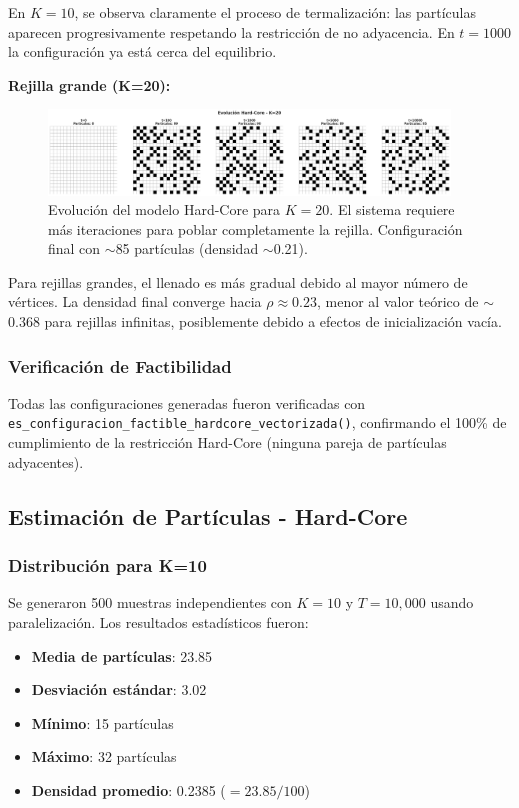 En $K=10$, se observa claramente el proceso de termalización: las partículas aparecen progresivamente respetando la restricción de no adyacencia. En $t=1000$ la configuración ya está cerca del equilibrio.

\textbf{Rejilla grande (K=20):}

\begin{figure}[H]
\centering
\includegraphics[width=0.95\textwidth]{../images/hardcore_evolucion_K20.png}
\caption{Evolución del modelo Hard-Core para $K=20$. El sistema requiere más iteraciones para poblar completamente la rejilla. Configuración final con $\sim$85 partículas (densidad $\sim$0.21).}
\end{figure}

Para rejillas grandes, el llenado es más gradual debido al mayor número de vértices. La densidad final converge hacia $\rho \approx 0.23$, menor al valor teórico de $\sim$0.368 para rejillas infinitas, posiblemente debido a efectos de inicialización vacía.

\subsubsection{Verificación de Factibilidad}

Todas las configuraciones generadas fueron verificadas con \texttt{es\_configuracion\_factible\_hardcore\_vectorizada()}, confirmando el 100\% de cumplimiento de la restricción Hard-Core (ninguna pareja de partículas adyacentes).

\subsection{Estimación de Partículas - Hard-Core}

\subsubsection{Distribución para K=10}

Se generaron 500 muestras independientes con $K=10$ y $T=10{,}000$ usando paralelización. Los resultados estadísticos fueron:

\begin{itemize}
\item \textbf{Media de partículas}: 23.85
\item \textbf{Desviación estándar}: 3.02
\item \textbf{Mínimo}: 15 partículas
\item \textbf{Máximo}: 32 partículas
\item \textbf{Densidad promedio}: 0.2385 ($= 23.85 / 100$)
\end{itemize}

